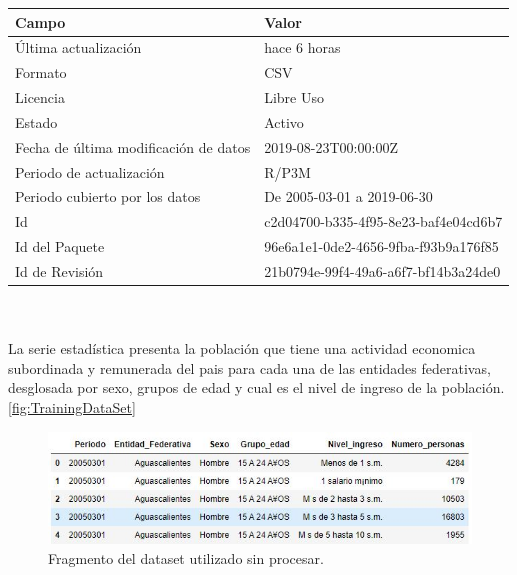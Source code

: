 \begin{tabular}{|l|l}
\rowcolor[HTML]{C0C0C0} 
\textbf{Campo}                        & \textbf{Valor}                       \\ \hline
\'Ultima actualizaci\'on                  & hace 6 horas                         \\ \hline
Formato                               & CSV                                  \\ \hline
Licencia                              & Libre Uso                            \\ \hline
Estado                                & Activo                               \\ \hline
Fecha de \'ultima modificaci\'on de datos & 2019-08-23T00:00:00Z                 \\ \hline
Periodo de actualizaci\'on              & R/P3M                                \\ \hline
Periodo cubierto por los datos        & De 2005-03-01 a 2019-06-30           \\ \hline
Id                                    & c2d04700-b335-4f95-8e23-baf4e04cd6b7 \\ \hline
Id del Paquete                        & 96e6a1e1-0de2-4656-9fba-f93b9a176f85 \\ \hline
Id de Revisi\'on                        & 21b0794e-99f4-49a6-a6f7-bf14b3a24de0 \\ \hline
\end{tabular}
\caption{}
\label{tab:my-table}
\\
\\
La serie estad\'istica presenta la poblaci\'on que tiene una actividad economica subordinada y remunerada del pais para cada una de las entidades federativas, desglosada por sexo, grupos de edad y cual es el nivel de ingreso de la poblaci\'on.\ref{fig:TrainingDataSet}\cite{datosAbiertos_2019}
\\
\begin{figure}[h!]
	\centering
	\includegraphics[width=1\linewidth]{Figure/InitialDataSet_Standarization.JPG}
	\caption{Fragmento del dataset utilizado sin procesar.}
	\label{fig:InitialDataSet}
\end{figure}

